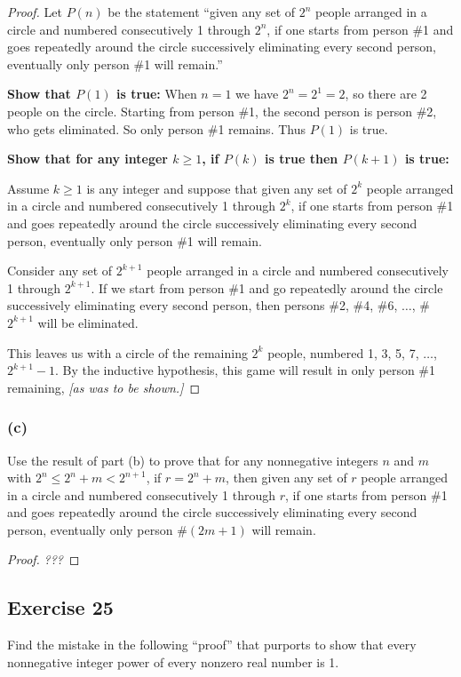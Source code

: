\documentclass[14pt]{extarticle}
\begin{document}
\begin{proof}
Let $P(n)$ be the statement ``given any set of $2^n$ people arranged in a circle and numbered consecutively 1 through
$2^n$, if one starts from person \#1 and goes repeatedly around the circle successively eliminating every second
person, eventually only person \#1 will remain.''

{\bf Show that $P(1)$ is true:} When $n = 1$ we have $2^n = 2^1 = 2$, so there are 2 people on the circle. 
Starting from person \#1, the second person is person \#2, who gets eliminated. So only person \#1 remains.
Thus $P(1)$ is true.

{\bf Show that for any integer $k \geq 1$, if $P(k)$ is true then $P(k+1)$ is true:}

Assume $k \geq 1$ is any integer and suppose that given any set of $2^k$ people arranged in a circle and numbered
consecutively 1 through $2^k$, if one starts from person \#1 and goes repeatedly around the circle successively 
eliminating every second person, eventually only person \#1 will remain.

Consider any set of $2^{k+1}$ people arranged in a circle and numbered consecutively 1 through $2^{k+1}$.
If we start from person \#1 and go repeatedly around the circle successively eliminating every second person,
then persons \#2, \#4, \#6, $\ldots$, \#$2^{k+1}$ will be eliminated.

This leaves us with a circle of the remaining $2^k$ people, numbered 1, 3, 5, 7, $\ldots$, $2^{k+1}-1$. 
By the inductive hypothesis, this game will result in only person \#1 remaining, {\it [as was to be shown.]}
\end{proof}

\subsubsection{(c)}
Use the result of part (b) to prove that for any nonnegative integers $n$ and $m$ with $2^n \leq 2^n + m < 2^{n+1}$, 
if $r = 2^n + m$, then given any set of $r$ people arranged in a circle and numbered consecutively 1 through $r$, 
if one starts from person \#1 and goes repeatedly around the circle successively eliminating every second person, eventually only person \#$(2m + 1)$ will remain.

\begin{proof}
{\it ???}
\end{proof}

\subsection{Exercise 25}
Find the mistake in the following “proof” that purports to show that every nonnegative integer power of every nonzero real number is 1.
\end{document}
